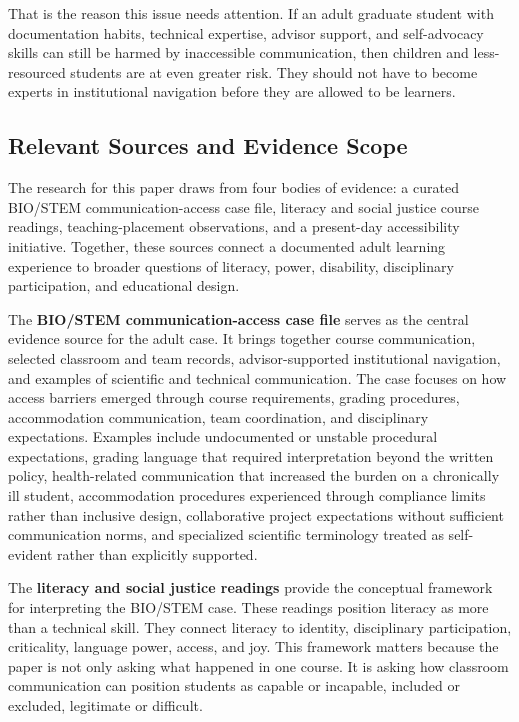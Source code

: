 \documentclass[12pt]{article}
\begin{document}
That is the reason this issue needs attention. If an adult graduate student with documentation habits, technical expertise, advisor support, and self-advocacy skills can still be harmed by inaccessible communication, then children and less-resourced students are at even greater risk. They should not have to become experts in institutional navigation before they are allowed to be learners.

\subsection*{Relevant Sources and Evidence Scope}

The research for this paper draws from four bodies of evidence: a curated BIO/STEM communication-access case file, literacy and social justice course readings, teaching-placement observations, and a present-day accessibility initiative. Together, these sources connect a documented adult learning experience to broader questions of literacy, power, disability, disciplinary participation, and educational design.

The \textbf{BIO/STEM communication-access case file} serves as the central evidence source for the adult case. It brings together course communication, selected classroom and team records, advisor-supported institutional navigation, and examples of scientific and technical communication. The case focuses on how access barriers emerged through course requirements, grading procedures, accommodation communication, team coordination, and disciplinary expectations. Examples include undocumented or unstable procedural expectations, grading language that required interpretation beyond the written policy, health-related communication that increased the burden on a chronically ill student, accommodation procedures experienced through compliance limits rather than inclusive design, collaborative project expectations without sufficient communication norms, and specialized scientific terminology treated as self-evident rather than explicitly supported.

The \textbf{literacy and social justice readings} provide the conceptual framework for interpreting the BIO/STEM case. These readings position literacy as more than a technical skill. They connect literacy to identity, disciplinary participation, criticality, language power, access, and joy. This framework matters because the paper is not only asking what happened in one course. It is asking how classroom communication can position students as capable or incapable, included or excluded, legitimate or difficult.
\end{document}
